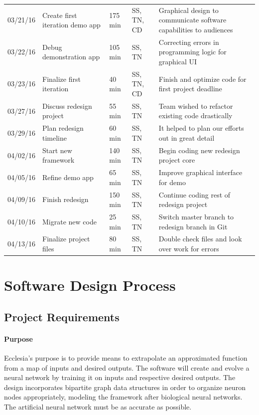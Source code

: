 \documentclass[letterpaper, 10pt]{article}
\begin{document}
\begin{center}
\begin{tabular} { l || p{1.25 in}| l| l|p{2.50in}}
		03/21/16 	& Create first iteration demo app			& 175 min	& SS, TN, CD	& Graphical design to communicate software capabilities to audiences \\
		03/22/16 	& Debug demonstration app 				& 105 min	& SS, TN 		& Correcting errors in programming logic for graphical UI \\
		03/23/16 	& Finalize first iteration 					& 40 min 	& SS, TN, CD	& Finish and optimize code for first project deadline \\
		03/27/16 	& Discuss redesign project 				& 55 min	& SS, TN 		& Team wished to refactor existing code drastically \\
		03/29/16 	& Plan redesign timeline					& 60 min	& SS, TN 		& It helped to plan our efforts out in great detail \\
		04/02/16 	& Start new framework 					& 140 min	& SS, TN 		& Begin coding new redesign project core \\
		04/05/16 	& Refine demo app						& 65 min	& SS, TN 		& Improve graphical interface for demo \\
		04/09/16 	& Finish redesign		 				& 150 min	& SS, TN 		& Continue coding rest of redesign project\\
		04/10/16 	& Migrate new code						& 25 min	& SS, TN 		& Switch master branch to redesign branch in Git \\
		04/13/16 	& Finalize project files					& 80 min	& SS, TN 		& Double check files and look over work for errors\\
		
	\end{tabular}
	\end{center}
	
	\normalsize
	
\cleardoublepage
\section{Software Design Process}
	\subsection{Project Requirements}
		\paragraph{Purpose}
		Ecclesia's purpose is to provide means to extrapolate an approximated function from a map of inputs and desired outputs. The software will create and evolve a neural network by training it on inputs and respective desired outputs. The design incorporates bipartite graph data structures in order to organize neuron nodes appropriately, modeling the framework after biological neural networks. The artificial neural network must be as accurate as possible.
\end{document}
